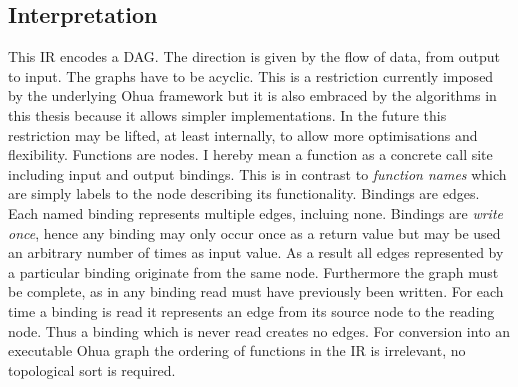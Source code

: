 \subsection{Interpretation}

This IR encodes a DAG.
The direction is given by the flow of data, from output to input.
The graphs have to be acyclic.
This is a restriction currently imposed by the underlying Ohua framework but it is also embraced by the algorithms in this thesis because it allows simpler implementations.
In the future this restriction may be lifted, at least internally, to allow more optimisations and flexibility.
Functions are nodes.
I hereby mean a function as a concrete call site including input and output bindings.
This is in contrast to \textit{function names} which are simply labels to the node describing its functionality.
Bindings are edges.
Each named binding represents multiple edges, incluing none.
Bindings are \textit{write once}, hence any binding may only occur once as a return value but may be used an arbitrary number of times as input value.
As a result all edges represented by a particular binding originate from the same node.
Furthermore the graph must be complete, as in any binding read must have previously been written.
For each time a binding is read it represents an edge from its source node to the reading node.
Thus a binding which is never read creates no edges.
For conversion into an executable Ohua graph the ordering of functions in the IR is irrelevant, no topological sort is required.
